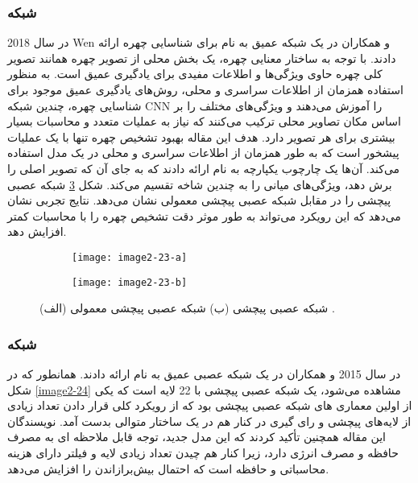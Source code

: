 \subsubsection{	شبکه }
در سال 2018 Wen و همکاران در \cite{WEN201894} یک شبکه عمیق به نام  برای شناسایی چهره ارائه دادند. با توجه به ساختار معنایی چهره، یک بخش محلی از تصویر چهره همانند تصویر کلی چهره حاوی ویژگی‌ها و اطلاعات مفیدی برای یادگیری عمیق است. به منظور استفاده همزمان از اطلاعات سراسری و محلی، روش‌های یادگیری عمیق موجود برای شناسایی چهره، چندین شبکه CNN را آموزش می‌دهند و ویژگی‌های مختلف را بر اساس مکان تصاویر محلی ترکیب می‌کنند که نیاز به عملیات متعدد و محاسبات بسیار بیشتری برای هر تصویر دارد. هدف این مقاله بهبود تشخیص چهره تنها با یک عملیات پیشخور  است که به طور همزمان از اطلاعات سراسری و محلی در یک مدل استفاده می‌کند. آن‌ها یک چارچوب یکپارچه به نام  ارائه دادند که به جای آن که تصویر اصلی را برش دهد، ویژگی‌های میانی را به چندین شاخه تقسیم می‌کند. شکل ‏\ref{image2-23} شبکه عصبی پیچشی  را در مقابل شبکه عصبی پیچشی معمولی نشان می‌دهد. نتایج تجربی نشان می‌دهد که این رویکرد می‌تواند به طور موثر دقت تشخیص چهره را با محاسبات کمتر افزایش دهد. 

\begin{figure}
\begin{subfigure}{.5\textwidth}
  \centering
  \texttt{[image: image2-23-a]}
  \label{image2-23-a}
\end{subfigure}
\begin{subfigure}{.5\textwidth}
  \centering
  \texttt{[image: image2-23-b]}
  \label{image2-23-b}
\end{subfigure}
  \caption{ (الف) شبکه عصبی پیچشی   (ب) شبکه عصبی پیچشی معمولی \cite{WEN201894}.}
\label{image2-23}
\end{figure}

\subsubsection{	شبکه }
در سال 2015  و همکاران در \cite{7298594} یک شبکه عصبی عمیق به نام  ارائه دادند. همانطور که در شکل \ref{image2-24} مشاهده می‌شود،  یک شبکه عصبی پیچشی با 22 لایه است که یکی از اولین معماری های شبکه عصبی پیچشی بود که از رویکرد کلی قرار دادن تعداد زیادی از لایه‌های پیچشی و رای گیری  در کنار هم در یک ساختار متوالی بدست آمد. نویسندگان این مقاله همچنین تأکید کردند که این مدل جدید، توجه قابل ملاحظه ای به مصرف حافظه و مصرف انرژی دارد، زیرا کنار هم چیدن تعداد زیادی لایه و فیلتر دارای هزینه محاسباتی و حافظه است که احتمال بيش‌برازاندن  را افزایش می‌دهد.
 
